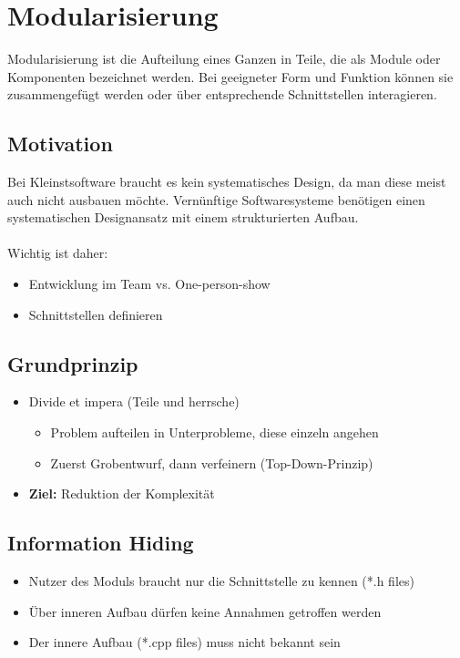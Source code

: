 \section{Modularisierung}
Modularisierung ist die Aufteilung eines Ganzen in Teile, die als Module oder Komponenten bezeichnet werden. Bei geeigneter Form und Funktion können sie zusammengefügt werden oder über entsprechende Schnittstellen interagieren.

\subsection{Motivation}
Bei Kleinstsoftware braucht es kein systematisches Design, da man diese meist auch nicht ausbauen möchte. Vernünftige Softwaresysteme benötigen einen systematischen Designansatz mit einem strukturierten Aufbau.\\\\
Wichtig ist daher:
	\begin{itemize}
	\item Entwicklung im Team vs. One-person-show
  	\item Schnittstellen definieren
	\end{itemize}

\subsection{Grundprinzip}
\begin{itemize}
  \item Divide et impera (Teile und herrsche)
  \begin{itemize}
    \item Problem aufteilen in Unterprobleme, diese einzeln angehen
    \item Zuerst Grobentwurf, dann verfeinern (Top-Down-Prinzip)
  \end{itemize}
  \item \textbf{Ziel:} Reduktion der Komplexität
\end{itemize}

\subsection{Information Hiding}
\begin{itemize}
  \item Nutzer des Moduls braucht nur die Schnittstelle zu kennen (*.h files)
  \item Über inneren Aufbau dürfen keine Annahmen getroffen werden
  \item Der innere Aufbau (*.cpp files) muss nicht bekannt sein
\end{itemize}

